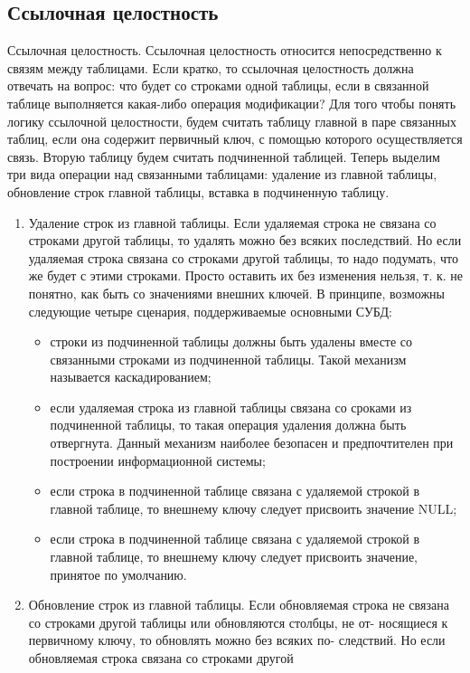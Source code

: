 \subsection{Ссылочная целостность}
Ссылочная целостность. Ссылочная целостность относится непосредственно к связям между таблицами. Если кратко, то ссылочная целостность
должна отвечать на вопрос: что будет со строками одной таблицы, если в
связанной таблице выполняется какая-либо операция модификации? Для
того чтобы понять логику ссылочной целостности, будем считать таблицу
главной в паре связанных таблиц, если она содержит первичный ключ, с
помощью которого осуществляется связь. Вторую таблицу будем считать
подчиненной таблицей. Теперь выделим три вида операции над связанными таблицами: удаление из главной таблицы, обновление строк главной
таблицы, вставка в подчиненную таблицу.
\begin{enumerate}
\item Удаление строк из главной таблицы. Если удаляемая строка не связана
со строками другой таблицы, то удалять можно без всяких последствий. Но если удаляемая строка связана со строками другой таблицы, то
надо подумать, что же будет с этими строками. Просто оставить их без
изменения нельзя, т. к. не понятно, как быть со значениями внешних
ключей. В принципе, возможны следующие четыре сценария, поддерживаемые основными СУБД:
\begin{itemize}
\item строки из подчиненной таблицы должны быть удалены вместе со
связанными строками из подчиненной таблицы. Такой механизм называется каскадированием;
\item если удаляемая строка из главной таблицы связана со сроками из
подчиненной таблицы, то такая операция удаления должна быть отвергнута. Данный механизм наиболее безопасен и предпочтителен
при построении информационной системы;
\item если строка в подчиненной таблице связана с удаляемой строкой в
главной таблице, то внешнему ключу следует присвоить значение
NULL;
\item если строка в подчиненной таблице связана с удаляемой строкой в
главной таблице, то внешнему ключу следует присвоить значение,
принятое по умолчанию.
\end{itemize}
\item Обновление строк из главной таблицы. Если обновляемая строка не
связана со строками другой таблицы или обновляются столбцы, не от-
носящиеся к первичному ключу, то обновлять можно без всяких по-
следствий. Но если обновляемая строка связана со строками другой

\end{enumerate}
